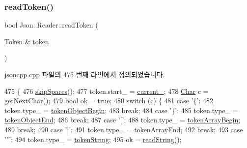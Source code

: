 \subsubsection{\texorpdfstring{read\+Token()}{readToken()}}
{\footnotesize\ttfamily bool Json\+::\+Reader\+::read\+Token (\begin{DoxyParamCaption}\item[{\hyperlink{class_json_1_1_reader_1_1_token}{Token} \&}]{token }\end{DoxyParamCaption})\hspace{0.3cm}{\ttfamily [private]}}



jsoncpp.\+cpp 파일의 475 번째 라인에서 정의되었습니다.


\begin{DoxyCode}
475                                    \{
476   \hyperlink{class_json_1_1_reader_a40d0f69d15aeb2d52ff78d794f5ab8b2}{skipSpaces}();
477   token.start\_ = \hyperlink{class_json_1_1_reader_a2f2feb5201a26da7aa133d2f7434479b}{current\_};
478   \hyperlink{class_json_1_1_reader_a3eec9118f3e9a672ba8348c3a79d0f45}{Char} c = \hyperlink{class_json_1_1_reader_ab61eb61333cc9ec3afe785663a53ce90}{getNextChar}();
479   \textcolor{keywordtype}{bool} ok = \textcolor{keyword}{true};
480   \textcolor{keywordflow}{switch} (c) \{
481   \textcolor{keywordflow}{case} \textcolor{charliteral}{'\{'}:
482     token.type\_ = \hyperlink{class_json_1_1_reader_aa35e6ab574dc399a0a645ad98ed66bc9a6196ce743696e6c803b130e8eef970f3}{tokenObjectBegin};
483     \textcolor{keywordflow}{break};
484   \textcolor{keywordflow}{case} \textcolor{charliteral}{'\}'}:
485     token.type\_ = \hyperlink{class_json_1_1_reader_aa35e6ab574dc399a0a645ad98ed66bc9a12d03a3a710b2d3f1384889df3da887d}{tokenObjectEnd};
486     \textcolor{keywordflow}{break};
487   \textcolor{keywordflow}{case} \textcolor{charliteral}{'['}:
488     token.type\_ = \hyperlink{class_json_1_1_reader_aa35e6ab574dc399a0a645ad98ed66bc9a366d1a18459ad0c3b5bd32a35391e35a}{tokenArrayBegin};
489     \textcolor{keywordflow}{break};
490   \textcolor{keywordflow}{case} \textcolor{charliteral}{']'}:
491     token.type\_ = \hyperlink{class_json_1_1_reader_aa35e6ab574dc399a0a645ad98ed66bc9a9adc87fd67f5fc21391a4be89382a316}{tokenArrayEnd};
492     \textcolor{keywordflow}{break};
493   \textcolor{keywordflow}{case} \textcolor{charliteral}{'"'}:
494     token.type\_ = \hyperlink{class_json_1_1_reader_aa35e6ab574dc399a0a645ad98ed66bc9ace89d4e0342535b8c00104ed4e5e0cee}{tokenString};
495     ok = \hyperlink{class_json_1_1_reader_a6328a0b1994e05118886f9fc9c608643}{readString}();

\end{DoxyCode}
